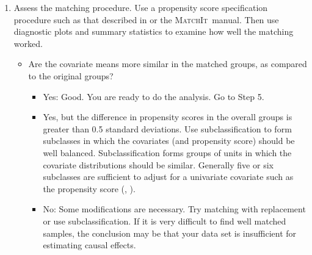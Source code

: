 \documentclass[11pt,titlepage]{article}
\newcommand{\MatchIt}{\textsc{MatchIt}}
\begin{document}
\begin{enumerate}
\begin{itemize}
\item Are there some units (either treated or control) that are
  outside the range of the propensity score values for the other
  group, i.e., are there some units     in one group that don't look
  like any units in the other group?  This can be seen in diagnostic
  plots such as those output by \MatchIt.
  \begin{itemize} 
  \item Yes: Consider discarding units outside the range of common
    support.
  \item No: Good!  That is a good situation for matching, and no
    explicit discarding needs to be done beyond the general matching
    process.
  \end{itemize}
\end{itemize}

\item Assess the matching procedure.  Use a propensity score
  specification procedure such as that described in \cite{DehWah02} or
  the \MatchIt\ manual.  Then use diagnostic plots and summary
  statistics to examine how well the matching worked.
  \begin{itemize} 
  \item Are the covariate means more similar in the matched groups, as
    compared to the original groups?
    \begin{itemize} 
    \item Yes: Good.  You are ready to do the analysis.  Go to Step 5.
    \item Yes, but the difference in propensity scores in the overall
      groups is greater than 0.5 standard deviations.  Use
      subclassification to form subclasses in which the covariates
      (and propensity score) should be well balanced.
      Subclassification forms groups of units in which the covariate
      distributions should be similar.  Generally five or six
      subclasses are sufficient to adjust for a univariate covariate
      such as the propensity score (\cite{Cochran68},
      \cite{RosRub84}).
    \item No: Some modifications are necessary.  Try matching with
      replacement or use subclassification.  If it is very difficult
      to find well matched samples, the conclusion may be that your
      data set is insufficient for estimating causal effects.
    \end{itemize}
  \end{itemize}
  

\end{enumerate}
\end{document}
